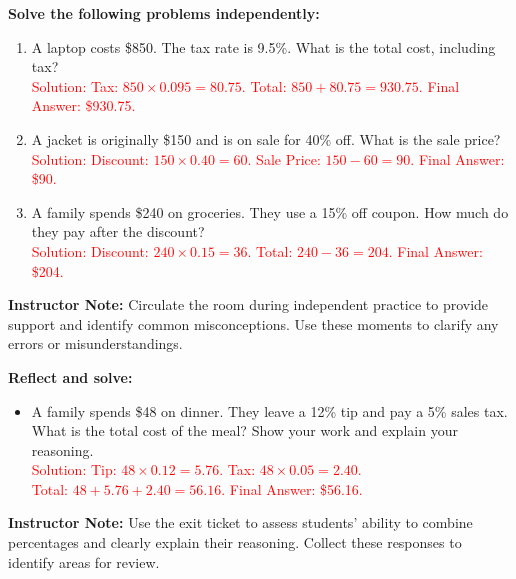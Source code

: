 \documentclass[12pt]{article}
\begin{document}
\vspace{1em}

\begin{tcolorbox}[colframe=black!60, colback=white, 
coltitle=black, colbacktitle=black!15, fonttitle=\bfseries\Large, 
title=Independent Practice, halign title=center, left=10pt, right=10pt, top=10pt, bottom=15pt]
\textbf{Solve the following problems independently:}
\begin{enumerate}[itemsep=5em]
    \item A laptop costs \$850. The tax rate is 9.5\%. What is the total cost, including tax? \\
    \textcolor{red}{Solution: Tax: \( 850 \times 0.095 = 80.75 \). Total: \( 850 + 80.75 = 930.75 \). Final Answer: \$930.75.}
    \item A jacket is originally \$150 and is on sale for 40\% off. What is the sale price? \\
    \textcolor{red}{Solution: Discount: \( 150 \times 0.40 = 60 \). Sale Price: \( 150 - 60 = 90 \). Final Answer: \$90.}
    \item A family spends \$240 on groceries. They use a 15\% off coupon. How much do they pay after the discount? \\
    \textcolor{red}{Solution: Discount: \( 240 \times 0.15 = 36 \). Total: \( 240 - 36 = 204 \). Final Answer: \$204.}
\end{enumerate}

{\color{blue} \textbf{Instructor Note:} Circulate the room during independent practice to provide support and identify common misconceptions. Use these moments to clarify any errors or misunderstandings.}
\end{tcolorbox}

\vspace{1em}

\begin{tcolorbox}[colframe=black!60, colback=white, 
coltitle=black, colbacktitle=black!15, fonttitle=\bfseries\Large, 
title=Exit Ticket, halign title=center, left=10pt, right=10pt, top=10pt, bottom=15pt]
\textbf{Reflect and solve:}
\begin{itemize}
    \item A family spends \$48 on dinner. They leave a 12\% tip and pay a 5\% sales tax. What is the total cost of the meal? Show your work and explain your reasoning. \\
    \textcolor{red}{Solution: Tip: \( 48 \times 0.12 = 5.76 \). Tax: \( 48 \times 0.05 = 2.40 \). \\ Total: \( 48 + 5.76 + 2.40 = 56.16 \). Final Answer: \$56.16.}
\end{itemize}

{\color{blue} \textbf{Instructor Note:} Use the exit ticket to assess students' ability to combine percentages and clearly explain their reasoning. Collect these responses to identify areas for review.}
\end{tcolorbox}
\end{document}
